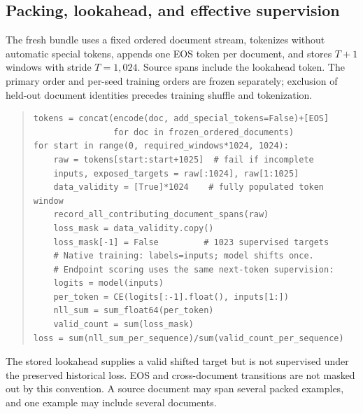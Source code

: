 \documentclass[11pt,letterpaper]{article}
\begin{document}
\subsection{Packing, lookahead, and effective supervision}
The fresh bundle uses a fixed ordered document stream, tokenizes without
automatic special tokens, appends one EOS token per document, and stores
$T+1$ windows with stride $T=1,024$. Source spans include the lookahead token.
The primary order and per-seed training orders are frozen separately; exclusion
of held-out document identities precedes training shuffle and tokenization.
\begin{quote}\small
\begin{verbatim}
tokens = concat(encode(doc, add_special_tokens=False)+[EOS]
                for doc in frozen_ordered_documents)
for start in range(0, required_windows*1024, 1024):
    raw = tokens[start:start+1025]  # fail if incomplete
    inputs, exposed_targets = raw[:1024], raw[1:1025]
    data_validity = [True]*1024    # fully populated token window
    record_all_contributing_document_spans(raw)
    loss_mask = data_validity.copy()
    loss_mask[-1] = False         # 1023 supervised targets
    # Native training: labels=inputs; model shifts once.
    # Endpoint scoring uses the same next-token supervision:
    logits = model(inputs)
    per_token = CE(logits[:-1].float(), inputs[1:])
    nll_sum = sum_float64(per_token)
    valid_count = sum(loss_mask)
loss = sum(nll_sum_per_sequence)/sum(valid_count_per_sequence)
\end{verbatim}
\end{quote}
The stored lookahead supplies a valid shifted target but is not supervised
under the preserved historical loss. EOS and cross-document transitions are not masked
out by this convention. A source document may span several packed examples,
and one example may include several documents.
\end{document}
